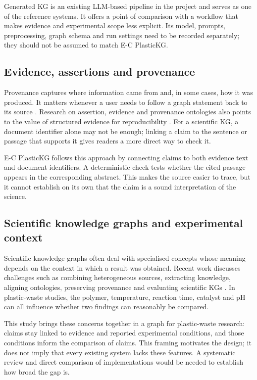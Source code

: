 \documentclass[11pt,a4paper]{article}
\begin{document}
Generated KG is an existing LLM-based pipeline in the project and serves as one of the reference systems. It offers a point of comparison with a workflow that makes evidence and experimental scope less explicit. Its model, prompts, preprocessing, graph schema and run settings need to be recorded separately; they should not be assumed to match E-C PlasticKG.

\subsection{Evidence, assertions and provenance}

Provenance captures where information came from and, in some cases, how it was produced. It matters whenever a user needs to follow a graph statement back to its source \citep{sikos2020}. Research on assertion, evidence and provenance ontologies also points to the value of structured evidence for reproducibility \citep{chhetri2025}. For a scientific KG, a document identifier alone may not be enough; linking a claim to the sentence or passage that supports it gives readers a more direct way to check it.

E-C PlasticKG follows this approach by connecting claims to both evidence text and document identifiers. A deterministic check tests whether the cited passage appears in the corresponding abstract. This makes the source easier to trace, but it cannot establish on its own that the claim is a sound interpretation of the science.

\subsection{Scientific knowledge graphs and experimental context}

Scientific knowledge graphs often deal with specialised concepts whose meaning depends on the context in which a result was obtained. Recent work discusses challenges such as combining heterogeneous sources, extracting knowledge, aligning ontologies, preserving provenance and evaluating scientific KGs \citep{scikg2026}. In plastic-waste studies, the polymer, temperature, reaction time, catalyst and pH can all influence whether two findings can reasonably be compared.

This study brings these concerns together in a graph for plastic-waste research: claims stay linked to evidence and reported experimental conditions, and those conditions inform the comparison of claims. This framing motivates the design; it does not imply that every existing system lacks these features. A systematic review and direct comparison of implementations would be needed to establish how broad the gap is.
\end{document}
